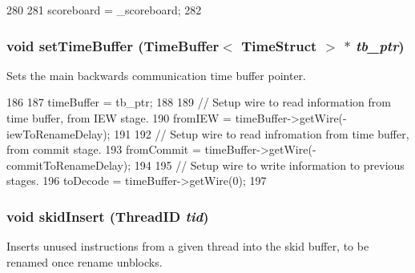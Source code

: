 \begin{DoxyCode}
280 {
281     scoreboard = _scoreboard;
282 }
\end{DoxyCode}
\hypertarget{classDefaultRename_a2b521ea5f191fff72265f60d4ed5187b}{
\subsubsection[{setTimeBuffer}]{\setlength{\rightskip}{0pt plus 5cm}void setTimeBuffer ({\bf TimeBuffer}$<$ {\bf TimeStruct} $>$ $\ast$ {\em tb\_\-ptr})}}
\label{classDefaultRename_a2b521ea5f191fff72265f60d4ed5187b}
Sets the main backwards communication time buffer pointer. 


\begin{DoxyCode}
186 {
187     timeBuffer = tb_ptr;
188 
189     // Setup wire to read information from time buffer, from IEW stage.
190     fromIEW = timeBuffer->getWire(-iewToRenameDelay);
191 
192     // Setup wire to read infromation from time buffer, from commit stage.
193     fromCommit = timeBuffer->getWire(-commitToRenameDelay);
194 
195     // Setup wire to write information to previous stages.
196     toDecode = timeBuffer->getWire(0);
197 }
\end{DoxyCode}
\hypertarget{classDefaultRename_ac24515147270ef9b85991bbe13bd47af}{
\subsubsection[{skidInsert}]{\setlength{\rightskip}{0pt plus 5cm}void skidInsert ({\bf ThreadID} {\em tid})}}
\label{classDefaultRename_ac24515147270ef9b85991bbe13bd47af}
Inserts unused instructions from a given thread into the skid buffer, to be renamed once rename unblocks. 


